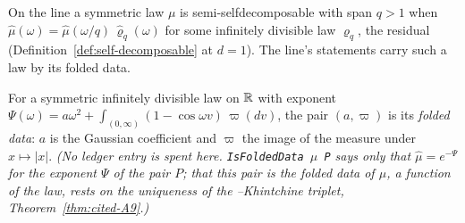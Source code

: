 On the line a symmetric law $\mu$ is semi-selfdecomposable with span $q > 1$ when
$\widehat\mu(\omega) = \widehat\mu(\omega/q)\,\widehat\varrho_q(\omega)$ for some infinitely
divisible law $\varrho_q$, the residual (Definition~\ref{def:self-decomposable} at $d = 1$). The
line's statements carry such a law by its folded data.

\begin{definition}
\label{def:folded-data}
\leanok
For a symmetric infinitely divisible law on $\mathbb{R}$ with exponent
$\Psi(\omega) = a\omega^2 + \int_{(0,\infty)}(1 - \cos\omega v)\,\varpi(dv)$, the pair
$(a, \varpi)$ is its \emph{folded data}: $a$ is the Gaussian coefficient and $\varpi$ the image
of the \Levy{} measure under $x \mapsto |x|$.
\statusT\quad\emph{(No ledger entry is spent here. \texttt{IsFoldedData $\mu$ P} says only that
$\widehat\mu = e^{-\Psi}$ for the exponent $\Psi$ of the pair $P$; that this pair is \emph{the}
folded data of $\mu$, a function of the law, rests on the uniqueness of the \Levy{}--Khintchine
triplet, Theorem~\ref{thm:cited-A9}.)}
\end{definition}

